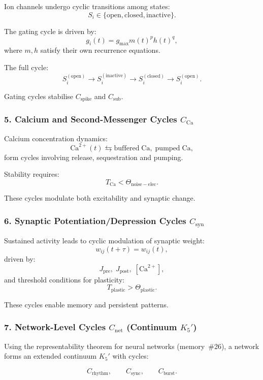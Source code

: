 Ion channels undergo cyclic transitions among states:
\[
  S_i \in \{\mathrm{open}, \mathrm{closed}, \mathrm{inactive}\}.
\]

The gating cycle is driven by:
\[
  g_i(t) = g_{\mathrm{max}} m(t)^p h(t)^q,
\]
where $m,h$ satisfy their own recurrence equations.

The full cycle:
\[
  S_i^{(\mathrm{open})}
  \to 
  S_i^{(\mathrm{inactive})}
  \to
  S_i^{(\mathrm{closed})}
  \to
  S_i^{(\mathrm{open})}.
\]

Gating cycles stabilise $C_{\mathrm{spike}}$ and $C_{\mathrm{sub}}$.

\subsubsection{5. Calcium and Second-Messenger Cycles $C_{\mathrm{Ca}}$}

Calcium concentration dynamics:
\[
  \mathrm{Ca}^{2+}(t)
  \leftrightarrows
  \mathrm{buffered\; Ca},\;
  \mathrm{pumped\; Ca},
\]
form cycles involving release, sequestration and pumping.

Stability requires:
\[
  T_{\mathrm{Ca}} < \Theta_{\mathrm{noise-elec}}.
\]

These cycles modulate both excitability and synaptic change.

\subsubsection{6. Synaptic Potentiation/Depression Cycles $C_{\mathrm{syn}}$}

Sustained activity leads to cyclic modulation of synaptic weight:
\[
  w_{ij}(t+\tau) = w_{ij}(t),
\]
driven by:
\[
  J_{\mathrm{pre}},\; J_{\mathrm{post}},\; [\mathrm{Ca}^{2+}],
\]
and threshold conditions for plasticity:
\[
  T_{\mathrm{plastic}} > \Theta_{\mathrm{plastic}}.
\]

These cycles enable memory and persistent patterns.

\subsubsection{7. Network-Level Cycles $C_{\mathrm{net}}$ (Continuum $K_5'$)}

Using the representability theorem for neural networks (memory~\#26),
a network forms an extended continuum $K_5'$ with cycles:

\[
  C_{\mathrm{rhythm}},
  \qquad
  C_{\mathrm{sync}},
  \qquad
  C_{\mathrm{burst}}.
\]

